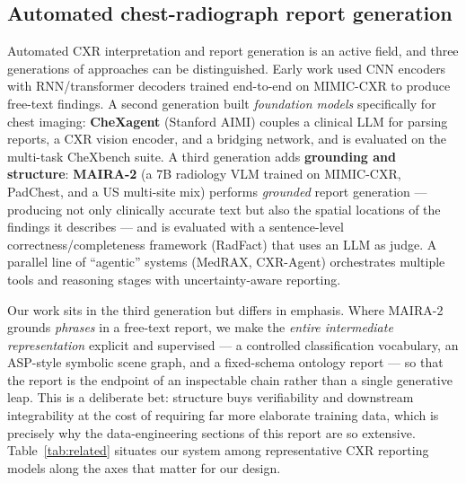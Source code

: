 \documentclass[11pt,a4paper]{article}
\begin{document}
\subsection{Automated chest-radiograph report generation}
Automated CXR interpretation and report generation is an active field, and three generations of approaches can be distinguished. Early work used CNN encoders with RNN/transformer decoders trained end-to-end on MIMIC-CXR to produce free-text findings. A second generation built \emph{foundation models} specifically for chest imaging: \textbf{CheXagent} (Stanford AIMI) couples a clinical LLM for parsing reports, a CXR vision encoder, and a bridging network, and is evaluated on the multi-task CheXbench suite. A third generation adds \textbf{grounding and structure}: \textbf{MAIRA-2} (a 7B radiology VLM trained on MIMIC-CXR, PadChest, and a US multi-site mix) performs \emph{grounded} report generation --- producing not only clinically accurate text but also the spatial locations of the findings it describes --- and is evaluated with a sentence-level correctness/completeness framework (RadFact) that uses an LLM as judge. A parallel line of ``agentic'' systems (MedRAX, CXR-Agent) orchestrates multiple tools and reasoning stages with uncertainty-aware reporting.

Our work sits in the third generation but differs in emphasis. Where MAIRA-2 grounds \emph{phrases} in a free-text report, we make the \emph{entire intermediate representation} explicit and supervised --- a controlled classification vocabulary, an ASP-style symbolic scene graph, and a fixed-schema ontology report --- so that the report is the endpoint of an inspectable chain rather than a single generative leap. This is a deliberate bet: structure buys verifiability and downstream integrability at the cost of requiring far more elaborate training data, which is precisely why the data-engineering sections of this report are so extensive. Table~\ref{tab:related} situates our system among representative CXR reporting models along the axes that matter for our design.
\end{document}
